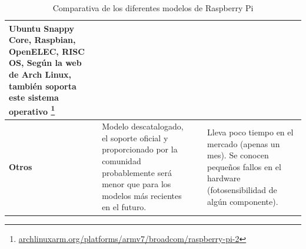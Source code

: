 \begin{landscape}
\begin{table}[h]
\begin{tabular}{|p{3.2cm}|p{6cm}|p{6cm}|p{6cm}|}
Ubuntu Snappy Core, Raspbian, OpenELEC, RISC OS, Según la web de Arch Linux, también soporta este sistema operativo \footnote{\href{http://archlinuxarm.org/platforms/armv7/broadcom/raspberry-pi-2}{archlinuxarm.org/platforms/armv7/broadcom/raspberry-pi-2}} \\

\hline %

\textbf{Otros} & Modelo descatalogado, el soporte oficial y proporcionado por la comunidad probablemente será menor que para los modelos más recientes en el futuro. &  & Lleva poco tiempo en el mercado (apenas un mes). Se conocen pequeños fallos en el hardware (fotosensibilidad de algún componente).\\ \hline

\end{tabular}
\caption{Comparativa de los diferentes modelos de Raspberry Pi}
\end{table}
\end{landscape}

